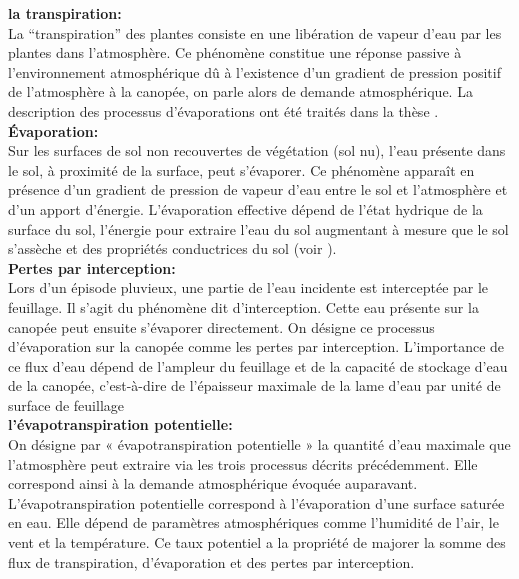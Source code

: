 \documentclass[a4paper,10pt]{article}
\begin{document}
	\textbf{la transpiration:}\\
	
	La ``transpiration'' des plantes consiste en une libération de vapeur d’eau par les plantes dans l’atmosphère. Ce phénomène constitue une réponse passive à l’environnement atmosphérique dû à l’existence d’un gradient de pression positif de l’atmosphère à la canopée, on parle alors de demande atmosphérique. La description des processus d'évaporations ont été traités dans la thèse \cite{maquin2016developpement}.\\
	
	\textbf{Évaporation:}\\
	
	Sur les surfaces de sol non recouvertes de végétation (sol nu), l’eau présente dans le sol, à proximité de la surface, peut s’évaporer. Ce phénomène apparaît en présence d’un gradient de pression de vapeur d’eau entre le sol et l’atmosphère et d’un apport d’énergie. L’évaporation effective dépend de l’état hydrique de la surface du sol, l’énergie pour extraire l’eau du sol augmentant à mesure que le sol s’assèche et des propriétés conductrices du sol (voir \cite{hillel2003introduction}). \\
	
	\textbf{Pertes par interception:}\\
	
	Lors d’un épisode pluvieux, une partie de l’eau incidente est interceptée par le feuillage. Il s’agit du phénomène dit d’interception. Cette eau présente sur la canopée peut ensuite s’évaporer directement. On désigne ce processus d’évaporation sur la canopée comme les pertes par interception. L’importance de ce flux d’eau dépend de l’ampleur du feuillage et de la capacité de stockage d’eau de la canopée, c’est-à-dire de l’épaisseur maximale de la lame d’eau par unité de surface de feuillage\\
	
	
	\textbf{l'évapotranspiration potentielle:}\\
	
	On désigne par « évapotranspiration potentielle » la quantité d’eau maximale que l’atmosphère peut extraire via les trois processus décrits précédemment. Elle correspond ainsi à la demande atmosphérique évoquée auparavant. L’évapotranspiration potentielle correspond à l’évaporation d’une surface saturée en eau. Elle dépend de paramètres atmosphériques comme l’humidité de l’air, le vent et la température. Ce taux potentiel a la propriété de majorer la somme des flux de transpiration, d’évaporation et des pertes par interception.
	
\end{document}
